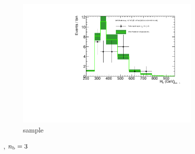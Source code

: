 \begin{figure}[h!]
\begin{subfigure}[b]{0.48\textwidth}
    \includegraphics[width=\textwidth,page=4]
    {Figs/results/v0/greenBand/bestFit_2012dev_RQcdZero_fZinvAll_3b_ge4j-1_smOnly}
    \caption{\mj sample}
  \end{subfigure}
  \caption{\njhigh, $n_{\text{b}} = 3$}
  \label{fig:green_fits_3b_ge4j}
\end{figure}

